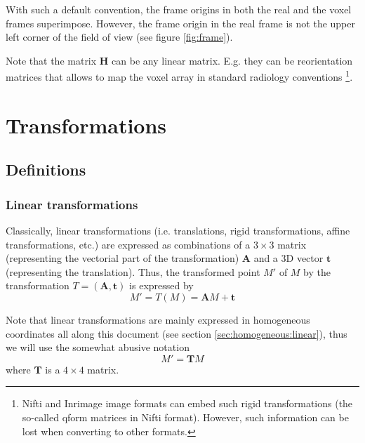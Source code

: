 \begin{attention}
With such a default convention, the frame origins in both the real and the voxel frames superimpose. However, the frame origin in the real frame is not the upper left corner of the field of view (see figure \ref{fig:frame}).
\end{attention}

Note that the matrix $\mathbf{H}$ can be any linear matrix. E.g. they can be reorientation matrices that allows to map the voxel array in standard radiology conventions \footnote{Nifti and Inrimage image formats can embed such rigid transformations (the so-called qform matrices in Nifti format). However, such information can be lost when converting to other formats.}.






%
%





\chapter{Transformations}


\section{Definitions}

\subsection{Linear transformations}

Classically, linear transformations (i.e. translations, rigid transformations, affine transformations, etc.) are expressed as combinations of a $3 \times 3$ matrix (representing the vectorial part of the transformation) $\mathbf{A}$ and a 3D vector $\mathbf{t}$ (representing the translation). Thus, the transformed point $M'$ of $M$ by the transformation $T=(\mathbf{A},\mathbf{t})$ is expressed by
\begin{displaymath}
M' = T(M) = \mathbf{A} M + \mathbf{t}
\end{displaymath}

Note that linear transformations are mainly expressed in homogeneous coordinates all along this document (see section \ref{sec:homogeneous:linear}), thus we will use the somewhat abusive notation
\begin{displaymath}
M' = \mathbf{T} M 
\end{displaymath}
where $\mathbf{T}$ is a $4 \times 4$ matrix.

